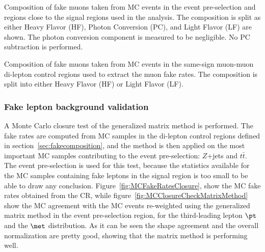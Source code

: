 \begin{table}[ht!]
\centering

\caption{
Composition of fake muons taken from  MC events in the event pre-selection and regions close to the signal regions used in the analysis. 
The composition is split as either Heavy Flavor (HF), Photon
Conversion (PC), and Light Flavor (LF) are shown. The photon conversion component
is measured to be negligible. No PC subtraction is performed.
}
\label{table:CompositionMuonCR}
\end{table}

\begin{table}[ht!]
\centering

\caption{
Composition of fake muons taken from  MC events in the same-sign muon-muon di-lepton control regions
used to extract the muon fake rates. The composition is split into either Heavy Flavor (HF) or Light Flavor (LF). 
}
\label{table:CompositionMuonSR}
\end{table}

\clearpage
\subsubsection{Fake lepton background validation}

A Monte Carlo closure test of the generalized matrix method is performed. The fake rates are computed from MC samples in the di-lepton control regions defined in section~\ref{sec:fakecomposition}, and the method is then applied on the most important MC samples contributing to the event pre-selection: $Z$+jets and $t\bar{t}$. The event pre-selection is used for this test, because the statistics available for the MC samples containing fake leptons in the signal region is too small to be able to draw any conclusion. Figure~\ref{fig:MCFakeRatesClosure}, show the MC fake rates obtained from the CR, while figure~\ref{fig:MCClosureCheckMatrixMethod} show the MC agreement with the MC events re-weighted using the generalized matrix method in the event pre-selection region, for the third-leading lepton $\pt$ and the $\met$ distribution. As it can be seen the shape agreement and the overall normalization are pretty good, showing that the matrix method is performing well.


